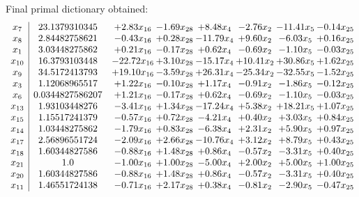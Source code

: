 \documentclass[8pt]{article}
\begin{document}
 Final primal dictionary obtained: 
\[\begin{array}{c| c c@{\hskip 2pt} c@{\hskip 2pt} c@{\hskip 2pt} c@{\hskip 2pt} c@{\hskip 2pt} c@{\hskip 2pt} }
 x_{7}   &  23.1379310345 & +  2.83 x_{16} & -1.69 x_{28} & +  8.48 x_{4} & -2.76 x_{2} & -11.41 x_{5} & -0.14 x_{25}\\
 x_{8}   &  2.84482758621 & -0.43 x_{16} & +  0.28 x_{28} & -11.79 x_{4} & +  9.60 x_{2} & -6.03 x_{5} & +  0.16 x_{25}\\
 x_{1}   &  3.03448275862 & +  0.21 x_{16} & -0.17 x_{28} & +  0.62 x_{4} & -0.69 x_{2} & -1.10 x_{5} & -0.03 x_{25}\\
 x_{10}   &  16.3793103448 & -22.72 x_{16} & +  3.10 x_{28} & -15.17 x_{4} & + 10.41 x_{2} & + 30.86 x_{5} & +  1.62 x_{25}\\
 x_{9}   &  34.5172413793 & + 19.10 x_{16} & -3.59 x_{28} & + 26.31 x_{4} & -25.34 x_{2} & -32.55 x_{5} & -1.52 x_{25}\\
 x_{3}   &  1.12068965517 & +  1.22 x_{16} & -0.10 x_{28} & +  1.17 x_{4} & -0.91 x_{2} & -1.86 x_{5} & -0.12 x_{25}\\
 x_{6}   &  0.0344827586207 & +  1.21 x_{16} & -0.17 x_{28} & +  0.62 x_{4} & -0.69 x_{2} & -1.10 x_{5} & -0.03 x_{25}\\
 x_{13}   &  1.93103448276 & -3.41 x_{16} & +  1.34 x_{28} & -17.24 x_{4} & +  5.38 x_{2} & + 18.21 x_{5} & +  1.07 x_{25}\\
 x_{15}   &  1.15517241379 & -0.57 x_{16} & +  0.72 x_{28} & -4.21 x_{4} & +  0.40 x_{2} & +  3.03 x_{5} & +  0.84 x_{25}\\
 x_{14}   &  1.03448275862 & -1.79 x_{16} & +  0.83 x_{28} & -6.38 x_{4} & +  2.31 x_{2} & +  5.90 x_{5} & +  0.97 x_{25}\\
 x_{17}   &  2.56896551724 & -2.09 x_{16} & +  2.66 x_{28} & -10.76 x_{4} & +  3.12 x_{2} & +  8.79 x_{5} & +  0.43 x_{25}\\
 x_{18}   &  1.60344827586 & -0.88 x_{16} & +  1.48 x_{28} & +  0.86 x_{4} & -0.57 x_{2} & -3.31 x_{5} & +  0.40 x_{25}\\
 x_{21}   &  1.0 & -1.00 x_{16} & +  1.00 x_{28} & -5.00 x_{4} & +  2.00 x_{2} & +  5.00 x_{5} & +  1.00 x_{25}\\
 x_{20}   &  1.60344827586 & -0.88 x_{16} & +  1.48 x_{28} & +  0.86 x_{4} & -0.57 x_{2} & -3.31 x_{5} & +  0.40 x_{25}\\
 x_{11}   &  1.46551724138 & -0.71 x_{16} & +  2.17 x_{28} & +  0.38 x_{4} & -0.81 x_{2} & -2.90 x_{5} & -0.47 x_{25}\\

\end{array}\]
\end{document}
